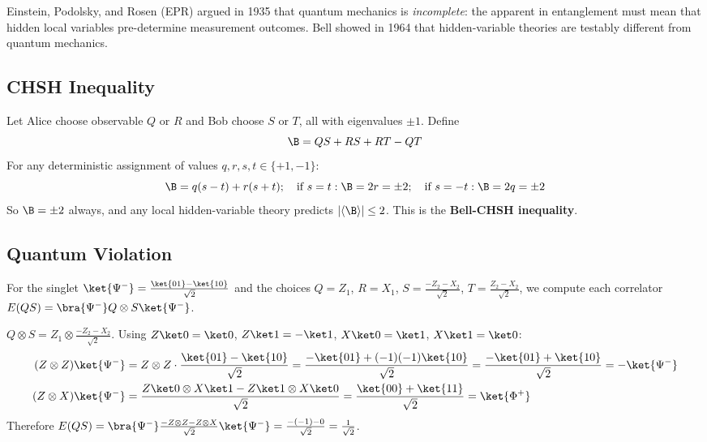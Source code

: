 \documentclass[oneside]{academica}
\begin{document}
Einstein, Podolsky, and Rosen (EPR) argued in 1935 that quantum mechanics is \emph{incomplete}: the  apparent in entanglement must mean that hidden local variables pre-determine measurement outcomes.
Bell showed in 1964 that hidden-variable theories are testably different from quantum mechanics.

\subsection{CHSH Inequality}

Let Alice choose observable $Q$ or $R$ and Bob choose $S$ or $T$, all with eigenvalues $\pm1$.
Define
\begin{equation*}
  \B=QS+RS+RT-QT
\end{equation*}
For any deterministic assignment of values $q,r,s,t\in\{+1,-1\}$:
\begin{equation*}
  \B=q(s-t)+r(s+t);\quad\text{if }s=t:\B=2r=\pm2;\quad\text{if }s=-t:\B=2q=\pm2
\end{equation*}
So $\B=\pm2$ always, and any local hidden-variable theory predicts $|\langle\B\rangle|\le2$.
This is the \textbf{Bell-CHSH inequality}.

\subsection{Quantum Violation}

For the singlet $\ket{\Psi^-}=\frac{\ket{01}-\ket{10}}{\sqrt{2}}$ and the choices $Q=Z_1$, $R=X_1$, $S=\frac{-Z_2-X_2}{\sqrt{2}}$, $T=\frac{Z_2-X_2}{\sqrt{2}}$, we compute each correlator $E(QS)=\bra{\Psi^-}Q\otimes S\ket{\Psi^-}$.

\begin{example*}
  $Q\otimes S = Z_1\otimes\frac{-Z_2-X_2}{\sqrt2}$.
  Using $Z\ket0=\ket0$, $Z\ket1=-\ket1$, $X\ket0=\ket1$, $X\ket1=\ket0$:
  \begin{align*}
    (Z\otimes Z)\ket{\Psi^-} &= Z\otimes Z\cdot\frac{\ket{01}-\ket{10}}{\sqrt2}
    = \frac{-\ket{01}+(-1)(-1)\ket{10}}{\sqrt2} = \frac{-\ket{01}+\ket{10}}{\sqrt2} = -\ket{\Psi^-} \\
    (Z\otimes X)\ket{\Psi^-} &= \frac{Z\ket0\otimes X\ket1-Z\ket1\otimes X\ket0}{\sqrt2}
    = \frac{\ket{00}+\ket{11}}{\sqrt2} = \ket{\Phi^+}
  \end{align*}
  Therefore $E(QS)=\bra{\Psi^-}\frac{-Z\otimes Z-Z\otimes X}{\sqrt2}\ket{\Psi^-} =\frac{-(-1)-0}{\sqrt2}=\frac{1}{\sqrt2}$.
\end{example*}
\end{document}
